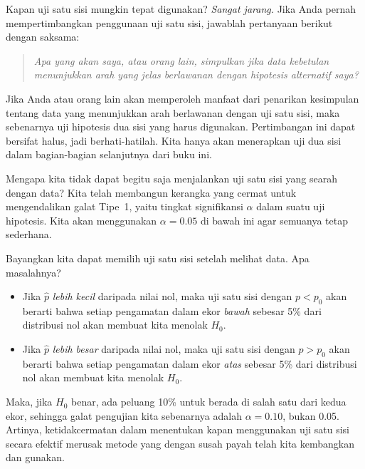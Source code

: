 Kapan uji satu sisi mungkin tepat digunakan?
\emph{Sangat jarang.}
Jika Anda pernah mempertimbangkan penggunaan
uji satu sisi, jawablah pertanyaan berikut dengan saksama:
\begin{quote}{\em
  Apa yang akan saya, atau orang lain, simpulkan jika data kebetulan
  menunjukkan arah yang jelas berlawanan dengan
  hipotesis alternatif saya?
}\end{quote}
Jika Anda atau orang lain akan memperoleh manfaat dari penarikan
kesimpulan tentang data yang menunjukkan arah berlawanan
dengan uji satu sisi, maka sebenarnya uji hipotesis
dua sisi yang harus digunakan.
Pertimbangan ini dapat bersifat halus, jadi berhati-hatilah.
Kita hanya akan menerapkan uji dua sisi dalam bagian-bagian selanjutnya
dari buku ini.

\begin{examplewrap}
\begin{nexample}{
    Mengapa kita tidak dapat begitu saja menjalankan uji satu sisi
    yang searah dengan data?}
  Kita telah membangun kerangka yang cermat untuk
  mengendalikan galat Tipe~1, yaitu
  tingkat signifikansi $\alpha$ dalam suatu uji hipotesis.
  Kita akan menggunakan $\alpha = 0.05$ di bawah ini agar
  semuanya tetap sederhana.

  Bayangkan kita dapat memilih uji satu sisi setelah
  melihat data. Apa masalahnya?
  \begin{itemize}
  \item Jika $\hat{p}$ \emph{lebih kecil} daripada
      nilai nol,
      maka uji satu sisi dengan $p < p_0$ akan
      berarti bahwa setiap pengamatan dalam
      ekor \emph{bawah} sebesar 5\% dari distribusi nol
      akan membuat kita menolak $H_0$.
  \item Jika $\hat{p}$ \emph{lebih besar} daripada
      nilai nol,
      maka uji satu sisi dengan $p > p_0$ akan
      berarti bahwa setiap pengamatan dalam
      ekor \emph{atas} sebesar 5\% dari distribusi nol
      akan membuat kita menolak $H_0$.
  \end{itemize}
  Maka, jika $H_0$ benar, ada peluang 10\% untuk
  berada di salah satu dari kedua ekor, sehingga galat pengujian kita
  sebenarnya adalah $\alpha = 0.10$, bukan 0.05.
  Artinya,
  ketidakcermatan dalam menentukan kapan menggunakan uji satu sisi
  secara efektif merusak metode yang dengan susah payah telah kita
  kembangkan dan gunakan.
\end{nexample}
\end{examplewrap}



{}
